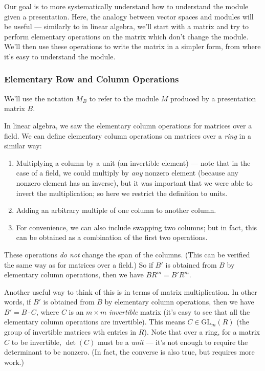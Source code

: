 Our goal is to more systematically understand how to understand the module given a presentation. Here, the analogy between vector spaces and modules will be useful --- similarly to in linear algebra, we'll start with a matrix and try to perform elementary operations on the matrix which don't change the module. We'll then use these operations to write the matrix in a simpler form, from where it's easy to understand the module. 


\subsubsection{Elementary Row and Column Operations}

We'll use the notation $M_B$ to refer to the module $M$ produced by a presentation matrix $B$. 

In linear algebra, we saw the elementary column operations for matrices over a field. We can define elementary column operations on matrices over a \emph{ring} in a similar way:
\begin{enumerate}
    \item Multiplying a column by a unit (an invertible element) --- note that in the case of a field, we could multiply by \emph{any} nonzero element (because any nonzero element has an inverse), but it was important that we were able to invert the multiplication; so here we restrict the definition to units. 
    \item Adding an arbitrary multiple of one column to another column. 
    \item For convenience, we can also include swapping two columns; but in fact, this can be obtained as a combination of the first two operations. 
\end{enumerate}

These operations \emph{do not} change the span of the columns. (This can be verified the same way as for matrices over a field.) So if $B'$ is obtained from $B$ by elementary column operations, then we have $BR^m = B'R^m$. 

Another useful way to think of this is in terms of matrix multiplication. In other words, if $B'$ is obtained from $B$ by elementary column operations, then we have $B' = B\cdot C$, where $C$ is an $m \times m$ \emph{invertible} matrix (it's easy to see that all the elementary column operations are invertible). This means $C \in \mathrm{GL}_m(R)$ (the group of invertible matrices wth entries in $R$). Note that over a ring, for a matrix $C$ to be invertible, $\det(C)$ must be a \emph{unit} --- it's not enough to require the determinant to be nonzero. (In fact, the converse is also true, but requires more work.)

